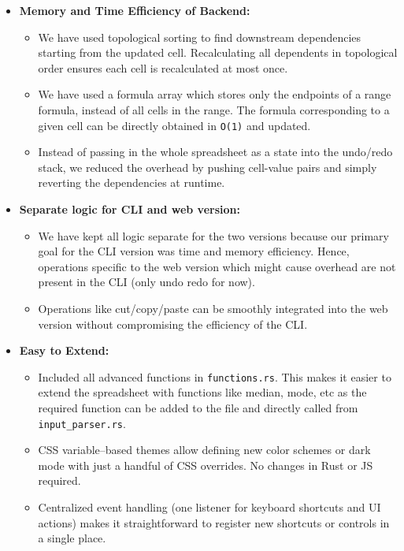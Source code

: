 \documentclass[12pt]{article}
\begin{document}
    \begin{itemize}
        \item \textbf{Memory and Time Efficiency of Backend:}
        \begin{itemize}
            \item We have used topological sorting to find downstream dependencies starting from the updated cell. Recalculating all dependents in topological order ensures each cell is recalculated at most once.
            \item We have used a formula array which stores only the endpoints of a range formula, instead of all cells in the range. The formula corresponding to a given cell can be directly obtained in \texttt{O(1)} and updated.
            \item Instead of passing in the whole spreadsheet as a state into the undo/redo stack, we reduced the overhead by pushing cell-value pairs and simply reverting the dependencies at runtime.
        \end{itemize}
        \item \textbf{Separate logic for CLI and web version:}
        \begin{itemize}
            \item We have kept all logic separate for the two versions because our primary goal for the CLI version was time and memory efficiency. Hence, operations specific to the web version which might cause overhead are not present in the CLI (only undo redo for now).
            \item Operations like cut/copy/paste can be smoothly integrated into the web version without compromising the efficiency of the CLI.
        \end{itemize}
        \item \textbf{Easy to Extend:}
        \begin{itemize}
            \item Included all advanced functions in \texttt{functions.rs}. This makes it easier to extend the spreadsheet with functions like median, mode, etc as the required function can be added to the file and directly called from \texttt{input\_parser.rs}.
            \item CSS variable–based themes allow defining new color schemes or dark mode with just a handful of CSS overrides. No changes in Rust or JS required.
            \item Centralized event handling (one listener for keyboard shortcuts and UI actions) makes it straightforward to register new shortcuts or controls in a single place.

\end{itemize}
\end{itemize}
\end{document}
